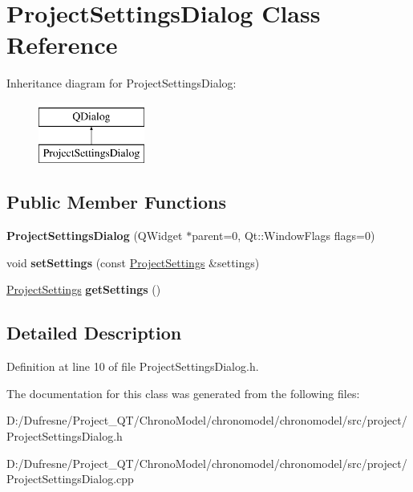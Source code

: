\hypertarget{class_project_settings_dialog}{\section{Project\-Settings\-Dialog Class Reference}
\label{class_project_settings_dialog}
}
Inheritance diagram for Project\-Settings\-Dialog\-:\begin{figure}[H]
\begin{center}
\leavevmode
\includegraphics[height=2.000000cm]{class_project_settings_dialog}
\end{center}
\end{figure}
\subsection*{Public Member Functions}
\begin{DoxyCompactItemize}
\item 
\hypertarget{class_project_settings_dialog_addafb750217a8dae864477238cbb3e2e}{{\bfseries Project\-Settings\-Dialog} (Q\-Widget $\ast$parent=0, Qt\-::\-Window\-Flags flags=0)}\label{class_project_settings_dialog_addafb750217a8dae864477238cbb3e2e}

\item 
\hypertarget{class_project_settings_dialog_a0bd445deee18143381ddd5d5526b2b92}{void {\bfseries set\-Settings} (const \hyperlink{class_project_settings}{Project\-Settings} \&settings)}\label{class_project_settings_dialog_a0bd445deee18143381ddd5d5526b2b92}

\item 
\hypertarget{class_project_settings_dialog_a1f16dc7db8081aab344b2ea88801593f}{\hyperlink{class_project_settings}{Project\-Settings} {\bfseries get\-Settings} ()}\label{class_project_settings_dialog_a1f16dc7db8081aab344b2ea88801593f}

\end{DoxyCompactItemize}


\subsection{Detailed Description}


Definition at line 10 of file Project\-Settings\-Dialog.\-h.



The documentation for this class was generated from the following files\-:\begin{DoxyCompactItemize}
\item 
D\-:/\-Dufresne/\-Project\-\_\-\-Q\-T/\-Chrono\-Model/chronomodel/chronomodel/src/project/Project\-Settings\-Dialog.\-h\item 
D\-:/\-Dufresne/\-Project\-\_\-\-Q\-T/\-Chrono\-Model/chronomodel/chronomodel/src/project/Project\-Settings\-Dialog.\-cpp\end{DoxyCompactItemize}
